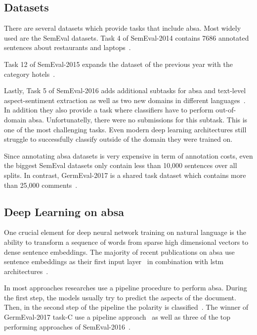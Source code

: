 \subsection{Datasets}

There are several datasets which provide tasks that include \gls{absa}. Most widely used are the SemEval datasets. Task 4 of SemEval-2014 contains 7686 annotated sentences about restaurants and laptops~\cite{Pontiki2014}. 

Task 12 of SemEval-2015 expands the dataset of the previous year with the category hotels~\cite{Pontiki2015a}. 

Lastly, Task 5 of SemEval-2016 adds additional subtasks for \gls{absa} and text-level aspect-sentiment extraction as well as two new domains in different languages~\cite{Pontiki2015a}. In addition they also provide a task where classifiers have to perform out-of-domain \gls{absa}. Unfortunatelly, there were no submissions for this subtask. This is one of the most challenging tasks. Even modern deep learning architectures still struggle to successfully classify outside of the domain they were trained on.
\medskip

Since annotating \gls{absa} datasets is very expensive in term of annotation costs, even the biggest SemEval datasets only contain less than 10,000 sentences over all splits. In contrast, GermEval-2017 is a shared task dataset which contains more than 25,000 comments~\cite{Wojatzki2017}.  

\subsection{Deep Learning on \gls{absa}}

One crucial element for deep neural network training on natural language is the ability to transform a sequence of words from sparse high dimensional vectors to dense sentence embeddings. The majority of recent publications on \gls{absa} use sentence embeddings as their first input layer~\cite{Ruder2016, Tang2016, Lee2017, Schmitt2018, Ma2018, Xue2018} in combination with \gls{lstm} architectures~\cite{Ruder2016, Tang2016, Ma2018}.
\medskip

In most approaches researches use a pipeline procedure to perform \gls{absa}. During the first step, the models usually try to predict the aspects of the document. Then, in the second step of the pipeline the polarity is classified~\cite{Lakkaraju2014}. The winner of GermEval-2017 task-C use a pipeline approach~\cite{Lee2017} as well as three of the top performing approaches of SemEval-2016~\cite{Brun2016, Kumar2016, Xenos2016}.
\medskip

